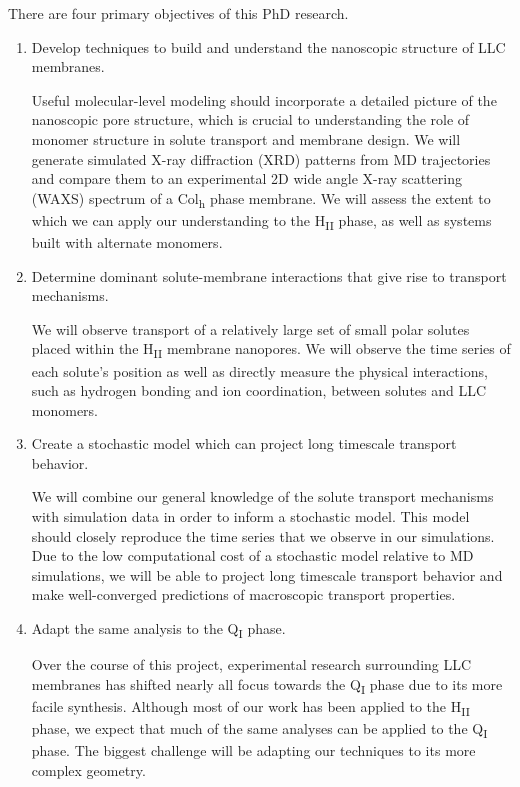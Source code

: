 \documentclass{article}
\begin{document}
  \noindent There are four primary objectives of this PhD research.
  \begin{enumerate}
  
    \item Develop techniques to build and understand the nanoscopic structure
    of LLC membranes.
    
    Useful molecular-level modeling should incorporate a detailed picture 
    of the nanoscopic pore structure, which is crucial to understanding
    the role of monomer structure in solute transport and membrane design.
    We will generate simulated X-ray diffraction (XRD) patterns from MD trajectories
    and compare them to an experimental 2D wide angle X-ray scattering (WAXS)
    spectrum of a Col\textsubscript{h} phase membrane. We will assess the extent
    to which we can apply our understanding to the H\textsubscript{II} phase,
    as well as systems built with alternate monomers.
    
    \item Determine dominant solute-membrane interactions that give rise to
    transport mechanisms.
    
    We will observe transport of a relatively large set of small polar solutes
    placed within the H\textsubscript{II} membrane nanopores. We will observe
    the time series of each solute's position as well as directly measure the
    physical interactions, such as hydrogen bonding and ion coordination, 
    between solutes and LLC monomers.
    
    \item Create a stochastic model which can project long timescale 
    transport behavior.
    
    We will combine our general knowledge of the solute transport mechanisms
    with simulation data in order to inform a stochastic model. This model
    should closely reproduce the time series that we observe in our simulations.
    Due to the low computational cost of a stochastic model relative to 
    MD simulations, we will be able to project long timescale transport behavior
    and make well-converged predictions of macroscopic transport properties.
           
    \item Adapt the same analysis to the Q\textsubscript{I} phase.
    
    Over the course of this project, experimental research surrounding
    LLC membranes has shifted nearly all focus towards the Q\textsubscript{I}
    phase due to its more facile synthesis.	Although most of our work has 
    been applied to the H\textsubscript{II} phase, we expect that much of 
    the same analyses can be applied to the Q\textsubscript{I} phase. The 
    biggest challenge will be adapting our techniques to its more complex
    geometry.
    

\end{enumerate}
\end{document}
